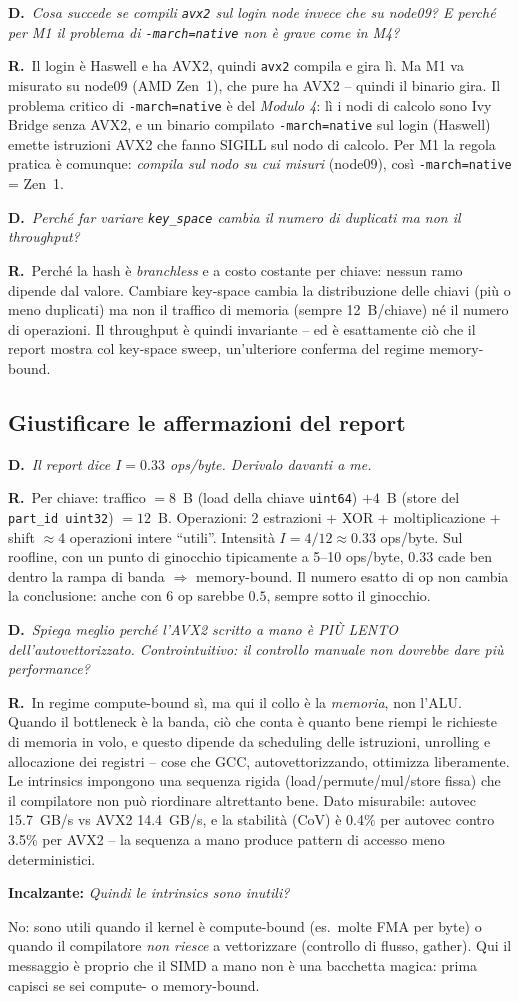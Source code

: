 \documentclass[11pt,a4paper]{article}
\newcommand{\D}[1]{\begin{dom}\small\textbf{D.}\ \itshape #1\end{dom}}
\newcommand{\R}{\noindent\textbf{R.}\ }
\newcommand{\Inc}[1]{\par\smallskip\noindent\textbf{\textcolor{red!55!black}{Incalzante:}} \textit{#1}\ \par}
\begin{document}
\D{Cosa succede se compili \texttt{avx2} sul login node invece che su node09? E perché per M1 il problema di \texttt{-march=native} non è grave come in M4?}
\R Il login è Haswell e ha AVX2, quindi \texttt{avx2} compila e gira lì. Ma M1 va misurato su node09 (AMD Zen~1), che pure ha AVX2 -- quindi il binario gira. Il problema critico di \texttt{-march=native} è del \emph{Modulo 4}: lì i nodi di calcolo sono Ivy Bridge senza AVX2, e un binario compilato \texttt{-march=native} sul login (Haswell) emette istruzioni AVX2 che fanno SIGILL sul nodo di calcolo. Per M1 la regola pratica è comunque: \emph{compila sul nodo su cui misuri} (node09), così \texttt{-march=native} = Zen~1.

\D{Perché far variare \texttt{key\_space} cambia il numero di duplicati ma non il throughput?}
\R Perché la hash è \emph{branchless} e a costo costante per chiave: nessun ramo dipende dal valore. Cambiare key-space cambia la distribuzione delle chiavi (più o meno duplicati) ma non il traffico di memoria (sempre 12~B/chiave) né il numero di operazioni. Il throughput è quindi invariante -- ed è esattamente ciò che il report mostra col key-space sweep, un'ulteriore conferma del regime memory-bound.

\subsection{Giustificare le affermazioni del report}

\D{Il report dice $I=0.33$ ops/byte. Derivalo davanti a me.}
\R Per chiave: traffico $=8$~B (load della chiave \texttt{uint64}) $+4$~B (store del \texttt{part\_id uint32}) $=12$~B. Operazioni: 2 estrazioni + XOR + moltiplicazione + shift $\approx 4$ operazioni intere ``utili''. Intensità $I = 4/12 \approx 0.33$ ops/byte. Sul roofline, con un punto di ginocchio tipicamente a 5--10 ops/byte, $0.33$ cade ben dentro la rampa di banda $\Rightarrow$ memory-bound. Il numero esatto di op non cambia la conclusione: anche con 6 op sarebbe $0.5$, sempre sotto il ginocchio.

\D{Spiega meglio perché l'AVX2 scritto a mano è PIÙ LENTO dell'autovettorizzato. Controintuitivo: il controllo manuale non dovrebbe dare più performance?}
\R In regime compute-bound sì, ma qui il collo è la \emph{memoria}, non l'ALU. Quando il bottleneck è la banda, ciò che conta è quanto bene riempi le richieste di memoria in volo, e questo dipende da scheduling delle istruzioni, unrolling e allocazione dei registri -- cose che GCC, autovettorizzando, ottimizza liberamente. Le intrinsics impongono una sequenza rigida (load/permute/mul/store fissa) che il compilatore non può riordinare altrettanto bene. Dato misurabile: autovec 15.7~GB/s vs AVX2 14.4~GB/s, e la stabilità (CoV) è 0.4\% per autovec contro 3.5\% per AVX2 -- la sequenza a mano produce pattern di accesso meno deterministici.
\Inc{Quindi le intrinsics sono inutili?} No: sono utili quando il kernel è compute-bound (es.\ molte FMA per byte) o quando il compilatore \emph{non riesce} a vettorizzare (controllo di flusso, gather). Qui il messaggio è proprio che il SIMD a mano non è una bacchetta magica: prima capisci se sei compute- o memory-bound.
\end{document}
